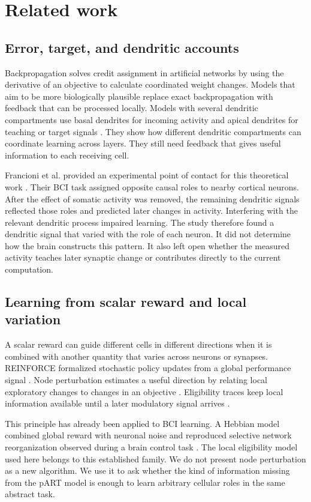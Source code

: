 \documentclass[11pt]{article}
\begin{document}
\section{Related work}
\subsection{Error, target, and dendritic accounts}
Backpropagation solves credit assignment in artificial networks by using the derivative of an objective to calculate coordinated weight changes. Models that aim to be more biologically plausible replace exact backpropagation with feedback that can be processed locally. Models with several dendritic compartments use basal dendrites for incoming activity and apical dendrites for teaching or target signals \citep{guerguiev2017,payeur2021}. They show how different dendritic compartments can coordinate learning across layers. They still need feedback that gives useful information to each receiving cell.

Francioni et al. provided an experimental point of contact for this theoretical work \citep{francioni2026}. Their BCI task assigned opposite causal roles to nearby cortical neurons. After the effect of somatic activity was removed, the remaining dendritic signals reflected those roles and predicted later changes in activity. Interfering with the relevant dendritic process impaired learning. The study therefore found a dendritic signal that varied with the role of each neuron. It did not determine how the brain constructs this pattern. It also left open whether the measured activity teaches later synaptic change or contributes directly to the current computation.

\subsection{Learning from scalar reward and local variation}
A scalar reward can guide different cells in different directions when it is combined with another quantity that varies across neurons or synapses. REINFORCE formalized stochastic policy updates from a global performance signal \citep{williams1992}. Node perturbation estimates a useful direction by relating local exploratory changes to changes in an objective \citep{fiete2006}. Eligibility traces keep local information available until a later modulatory signal arrives \citep{izhikevich2007,gerstner2018}.

This principle has already been applied to BCI learning. A Hebbian model combined global reward with neuronal noise and reproduced selective network reorganization observed during a brain control task \citep{legenstein2010}. The local eligibility model used here belongs to this established family. We do not present node perturbation as a new algorithm. We use it to ask whether the kind of information missing from the pART model is enough to learn arbitrary cellular roles in the same abstract task.
\end{document}
